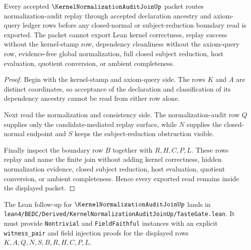 \begin{theorem}
\label{thm:kernel-normalization-audit-join-nonescape}
Every accepted $\KernelNormalizationAuditJoinUp$ packet routes normalization-audit replay through accepted declaration ancestry and axiom-query ledger rows before any closed-normal or subject-reduction boundary read is exported. The packet cannot export Lean kernel correctness, replay success without the kernel-stamp row, dependency cleanliness without the axiom-query row, evidence-free global normalization, full closed subject reduction, host evaluation, quotient conversion, or ambient completeness.
\end{theorem}
\begin{proof}
Begin with the kernel-stamp and axiom-query side. The rows $K$ and $A$ are distinct coordinates, so acceptance of the declaration and classification of its dependency ancestry cannot be read from either row alone.

Next read the normalization and consistency side. The normalization-audit row $Q$ supplies only the candidate-mediated replay surface, while $N$ supplies the closed-normal endpoint and $S$ keeps the subject-reduction obstruction visible.

Finally inspect the boundary row $B$ together with $R,H,C,P,L$. These rows replay and name the finite join without adding kernel correctness, hidden normalization evidence, closed subject reduction, host evaluation, quotient conversion, or ambient completeness. Hence every exported read remains inside the displayed packet.
\end{proof}



The Lean follow-up for $\KernelNormalizationAuditJoinUp$ lands in \texttt{lean4/BEDC/Derived/KernelNormalizationAuditJoinUp/TasteGate.lean}. It must provide \texttt{Nontrivial} and \texttt{FieldFaithful} instances with an explicit \texttt{witness\_pair} and field injection proofs for the displayed rows $K,A,Q,N,S,B,R,H,C,P,L$.

